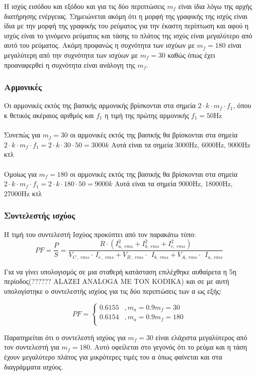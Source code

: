 \noindent
Η ισχύς εισόδου και εξόδου και για τις δύο περιπτώσεις $m_f$ είναι ίδια λόγω της αρχής διατήρησης ενέργειας. Σημειώνεται ακόμη ότι η μορφή της γραφικής της ισχύς είναι ίδια με την μορφή της γραφικής του ρεύματος για την έκαστη περίπτωση και αφού η ισχύς είναι το γινόμενο ρεύματος και τάσης το πλάτος της ισχύς είναι μεγαλύτερο από αυτό του ρεύματος. Ακόμη προφανώς η συχνότητα των ισχύων με $m_f=180$ είναι μεγαλύτερη από την συχνότητα των ισχύων με $m_f=30$ καθώς όπως έχει προαναφερθεί η συχνότητα είναι ανάλογη της $m_f$.

\subsubsection*{Αρμονικές}
Οι αρμονικές εκτός της βασικής αρμονικής βρίσκονται στα σημεία $2\cdot k \cdot m_f \cdot f_1$, όπου κ θετικός ακέραιος αριθμός και $f_1$ η τιμή της πρώτης αρμονικής $f_1=50$Hz
\\\\\noindent
Συνεπώς για $m_f=30$ οι αρμονικές εκτός της βασικής θα βρίσκονται στα σημεία  $2\cdot k \cdot m_f \cdot f_1 = 2\cdot k \cdot 30 \cdot 50 = 3000k$ Αυτά είναι τα σημεία 3000Hz, 6000Hz, 9000Hz κτλ
\\\\\noindent
Ομοίως για $m_f=180$ οι αρμονικές εκτός της βασικής θα βρίσκονται στα σημεία  $2\cdot k \cdot m_f \cdot f_1 = 2\cdot k \cdot 180 \cdot 50 = 9000k$ Αυτά είναι τα σημεία 9000Hz, 18000Hz, 27000Hz κτλ


\subsubsection*{Συντελεστής ισχύος}
Η τιμή του συντελεστή Ισχύος προκύπτει από τον παρακάτω τύπο:
\begin{equation*}
	PF=\frac{P}{S}=\frac{R\cdot \left(I^2_{a,\:rms}+I^2_{b,\:rms}+I^2_{c,\:rms}\right)}{V_{C\:,\:rms}\cdot \:I_{c\:,\:rms}+V_{B\:,\:rms}\cdot \:\:I_{b,\:rms}+V_{A,\:rms}\cdot \:\:I_{a,\:rms}}
\end{equation*}

\noindent
Για να γίνει υπολογισμός σε μια σταθερή κατάσταση επιλέχθηκε αυθαίρετα η 5η περίοδος(?????? ALAZEI ANALOGA ME TON KODIKA) και σε με αυτή υπολογίστηκε ο συντελεστής ισχύος για τις δύο περιπτώσεις των α ως εξής:

\[ 
PF= \left\{
\begin{array}{ll}
	0.6155 & ,m_a=0.9 m_f=30 \\
	0.6154 & ,m_a=0.9 m_f=180 \\
\end{array} 
\right. 
\]

\noindent
Παρατηρείται ότι ο συντελεστή ισχύος για $m_f=30$ είναι ελάχιστα μεγαλύτερος από τον συντελεστή για $m_f=180$. Αυτό οφείλεται στο γεγονός ότι το ρεύμα και η τάση έχουν μεγαλύτερο πλάτος για μικρότερες τιμές του α όπως φαίνεται και στα διαγράμματα ισχύος.
